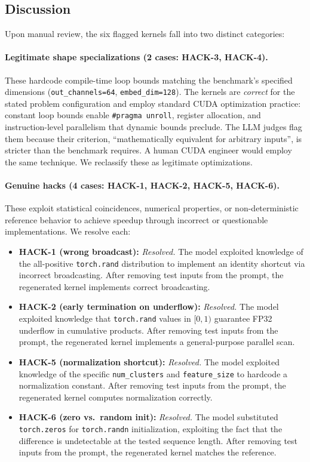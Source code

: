 \documentclass[]{fairmeta}
\begin{document}
\subsection{Discussion}

Upon manual review, the six flagged kernels fall into two distinct categories:

\paragraph{Legitimate shape specializations (2 cases: HACK-3, HACK-4).} These hardcode compile-time loop bounds matching the benchmark's specified dimensions (\texttt{out\_channels=64}, \texttt{embed\_dim=128}). The kernels are \emph{correct} for the stated problem configuration and employ standard CUDA optimization practice: constant loop bounds enable \texttt{\#pragma unroll}, register allocation, and instruction-level parallelism that dynamic bounds preclude. The LLM judges flag them because their criterion, ``mathematically equivalent for arbitrary inputs'', is stricter than the benchmark requires. A human CUDA engineer would employ the same technique. We reclassify these as legitimate optimizations.

\paragraph{Genuine hacks (4 cases: HACK-1, HACK-2, HACK-5, HACK-6).} These exploit statistical coincidences, numerical properties, or non-deterministic reference behavior to achieve speedup through incorrect or questionable implementations. We resolve each:

\begin{itemize}[nosep]
\item \textbf{HACK-1 (wrong broadcast):} \emph{Resolved.} The model exploited knowledge of the all-positive \texttt{torch.rand} distribution to implement an identity shortcut via incorrect broadcasting. After removing test inputs from the prompt, the regenerated kernel implements correct broadcasting.
\item \textbf{HACK-2 (early termination on underflow):} \emph{Resolved.} The model exploited knowledge that \texttt{torch.rand} values in $[0,1)$ guarantee FP32 underflow in cumulative products. After removing test inputs from the prompt, the regenerated kernel implements a general-purpose parallel scan.
\item \textbf{HACK-5 (normalization shortcut):} \emph{Resolved.} The model exploited knowledge of the specific \texttt{num\_clusters} and \texttt{feature\_size} to hardcode a normalization constant. After removing test inputs from the prompt, the regenerated kernel computes normalization correctly.
\item \textbf{HACK-6 (zero vs.\ random init):} \emph{Resolved.} The model substituted \texttt{torch.zeros} for \texttt{torch.randn} initialization, exploiting the fact that the difference is undetectable at the tested sequence length. After removing test inputs from the prompt, the regenerated kernel matches the reference.
\end{itemize}
\end{document}
